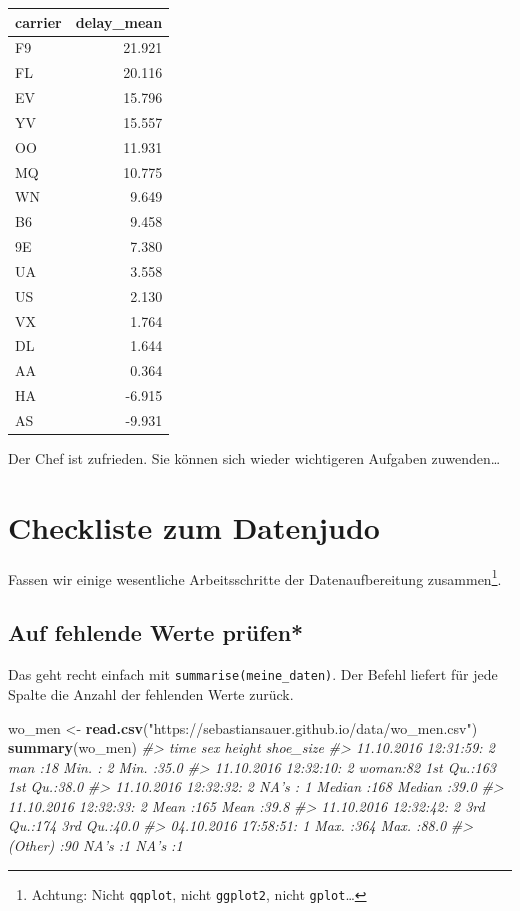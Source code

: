 \documentclass[12pt,]{book}
\makeatletter
\newenvironment{Shaded}{\begin{snugshade}}{\end{snugshade}}
\newcommand{\KeywordTok}[1]{\textcolor[rgb]{0.13,0.29,0.53}{\textbf{{#1}}}}
\newcommand{\StringTok}[1]{\textcolor[rgb]{0.31,0.60,0.02}{{#1}}}
\newcommand{\CommentTok}[1]{\textcolor[rgb]{0.56,0.35,0.01}{\textit{{#1}}}}
\newcommand{\NormalTok}[1]{{#1}}
\newenvironment{kframe}{%
\medskip{}
\setlength{\fboxsep}{.8em}
 \def\at@end@of@kframe{}%
 \ifinner\ifhmode%
  \def\at@end@of@kframe{\end{minipage}}%
  \begin{minipage}{\columnwidth}%
 \fi\fi%
 \def\FrameCommand##1{\hskip\@totalleftmargin \hskip-\fboxsep
 \colorbox{shadecolor}{##1}\hskip-\fboxsep
     \hskip-\linewidth \hskip-\@totalleftmargin \hskip\columnwidth}%
 \MakeFramed {\advance\hsize-\width
   \@totalleftmargin\z@ \linewidth\hsize
   \@setminipage}}%
 {\par\unskip\endMakeFramed%
 \at@end@of@kframe}
\renewenvironment{Shaded}{\begin{kframe}}{\end{kframe}}
\makeatother
\begin{document}
\begin{tabular}{l|r}
\hline
carrier & delay\_mean\\
\hline
F9 & 21.921\\
\hline
FL & 20.116\\
\hline
EV & 15.796\\
\hline
YV & 15.557\\
\hline
OO & 11.931\\
\hline
MQ & 10.775\\
\hline
WN & 9.649\\
\hline
B6 & 9.458\\
\hline
9E & 7.380\\
\hline
UA & 3.558\\
\hline
US & 2.130\\
\hline
VX & 1.764\\
\hline
DL & 1.644\\
\hline
AA & 0.364\\
\hline
HA & -6.915\\
\hline
AS & -9.931\\
\hline
\end{tabular}

Der Chef ist zufrieden. Sie können sich wieder wichtigeren Aufgaben
zuwenden\ldots{}

\section{Checkliste zum Datenjudo}\label{checkliste-zum-datenjudo}

Fassen wir einige wesentliche Arbeitsschritte der Datenaufbereitung
zusammen\footnote{Achtung: Nicht \texttt{qqplot}, nicht
  \texttt{ggplot2}, nicht \texttt{gplot}\ldots{}}.

\subsection{Auf fehlende Werte prüfen*}\label{auf-fehlende-werte-prufen}

Das geht recht einfach mit \texttt{summarise(meine\_daten)}. Der Befehl
liefert für jede Spalte die Anzahl der fehlenden Werte zurück.

\begin{Shaded}
\begin{Highlighting}[]
\NormalTok{wo_men <-}\StringTok{ }\KeywordTok{read.csv}\NormalTok{(}\StringTok{"https://sebastiansauer.github.io/data/wo_men.csv"}\NormalTok{)}
\KeywordTok{summary}\NormalTok{(wo_men)}
\CommentTok{#>                   time       sex         height      shoe_size   }
\CommentTok{#>  11.10.2016 12:31:59: 2   man  :18   Min.   :  2   Min.   :35.0  }
\CommentTok{#>  11.10.2016 12:32:10: 2   woman:82   1st Qu.:163   1st Qu.:38.0  }
\CommentTok{#>  11.10.2016 12:32:32: 2   NA's : 1   Median :168   Median :39.0  }
\CommentTok{#>  11.10.2016 12:32:33: 2              Mean   :165   Mean   :39.8  }
\CommentTok{#>  11.10.2016 12:32:42: 2              3rd Qu.:174   3rd Qu.:40.0  }
\CommentTok{#>  04.10.2016 17:58:51: 1              Max.   :364   Max.   :88.0  }
\CommentTok{#>  (Other)            :90              NA's   :1     NA's   :1}
\end{Highlighting}
\end{Shaded}
\end{document}
